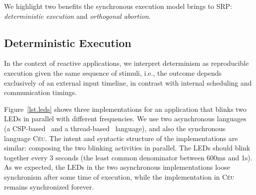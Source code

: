 \documentclass{acm_proc_article-sp}
\newcommand{\CEU}{\textsc{C\'{e}u}\xspace}
\newcommand{\1}{\;}
\newcommand{\2}{\;\;}
\newcommand{\3}{\;\;\;}
\newcommand{\5}{\;\;\;\;\;}
\begin{document}
We highlight two benefits the synchronous execution model brings to SRP:
\emph{deterministic execution} and \emph{orthogonal abortion}.

\subsection{Deterministic Execution}

In the context of reactive applications, we interpret determinism as 
reproducible execution given the same sequence of stimuli, i.e., the outcome 
depends exclusively of an external input timeline, in contrast with internal 
scheduling and communication timings.

Figure~\ref{lst.leds} shows three implementations for an application that 
blinks two LEDs in parallel with different frequencies.
We use two asynchronous languages (a CSP-based~\cite{arduino.occam} and a 
thread-based~\cite{arduino.chibios} language), and also the synchronous 
language \CEU.
%
The intent and syntactic structure of the implementations are similar:
composing the two blinking activities in parallel.
%
The LEDs should blink together every 3 seconds (the least common denominator 
between 600ms and 1s).
%
As we expected, the LEDs in the two asynchronous implementations loose 
synchronism after some time of execution, while the implementation in \CEU 
remains synchronized forever.
\end{document}
